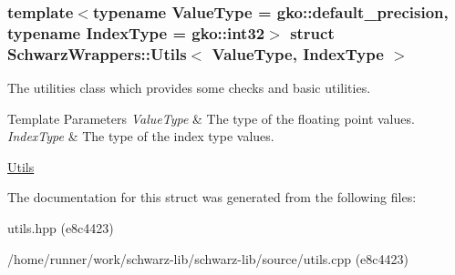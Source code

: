 \subsubsection*{template$<$typename Value\+Type = gko\+::default\+\_\+precision, typename Index\+Type = gko\+::int32$>$\newline
struct Schwarz\+Wrappers\+::\+Utils$<$ Value\+Type, Index\+Type $>$}

The utilities class which provides some checks and basic utilities. 


\begin{DoxyTemplParams}{Template Parameters}
{\em Value\+Type} & The type of the floating point values. \\
\hline
{\em Index\+Type} & The type of the index type values.\\
\hline
\end{DoxyTemplParams}
\hyperlink{group__utils}{Utils} 

The documentation for this struct was generated from the following files\+:\begin{DoxyCompactItemize}
\item 
utils.\+hpp (e8c4423)\item 
/home/runner/work/schwarz-\/lib/schwarz-\/lib/source/utils.\+cpp (e8c4423)\end{DoxyCompactItemize}
